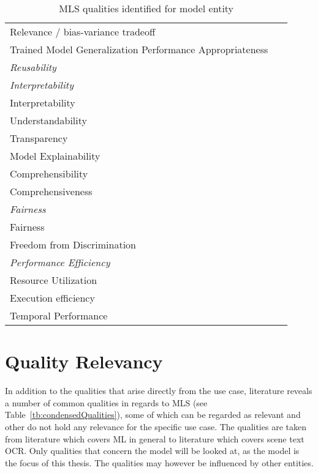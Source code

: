 \begin{table}[h]
\begin{tabular}{p{} p{}}
        Relevance / bias-variance tradeoff &~\cite{siebert_construction_2021, zhang_machine_2020} \\
        Trained Model Generalization Performance Appropriateness
                                                    &~\cite{nakamichi_requirements-driven_2020} \\
        \midrule
        \textit{Reusability} &~\cite{ashmore_assuring_2021} \\
        \midrule
        \textit{Interpretability} \\
        Interpretability &~\cite{ashmore_assuring_2021, siebert_construction_2021, zhang_machine_2020}\\
        Understandability &~\cite{nakamichi_requirements-driven_2020} \\
        Transparency &~\cite{arpteg_software_2018} \\
        Model Explainability &~\cite{vogelsang_requirements_2019} \\
        Comprehensibility &~\cite{ashmore_assuring_2021} \\
        Comprehensiveness &~\cite{ashmore_assuring_2021} \\
        \midrule
        \textit{Fairness}\\
        Fairness &~\cite{siebert_construction_2021, zhang_machine_2020} \\
        Freedom from Discrimination &~\cite{vogelsang_requirements_2019} \\
        \midrule
        \textit{Performance Efficiency} \\
        Resource Utilization &~\cite{siebert_construction_2021,
                                nakamichi_requirements-driven_2020} \\
        Execution efficiency &~\cite{siebert_construction_2021} \\
        Temporal Performance &~\cite{nakamichi_requirements-driven_2020} \\
        \bottomrule
    \end{tabular}
    \caption{MLS qualities identified for model entity}
\end{table}
\FloatBarrier

\section{Quality Relevancy}
In addition to the qualities that arise directly from the use case, literature reveals a number of
common qualities in regards to \ac{MLS} (see Table~\ref{tb:condensedQualities}), some of which
can be regarded as relevant and other do not hold any relevance for the specific use case.
The qualities are taken from literature which covers \ac{ML} in general to literature
which covers scene text \ac{OCR}.
Only qualities that concern the model will be looked at, as the model is the focus of this thesis.
The qualities may however be influenced by other entities.

